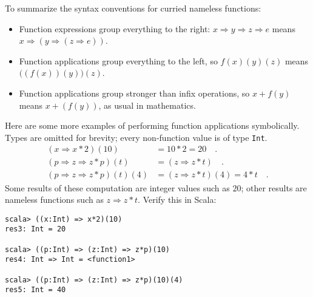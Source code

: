 To summarize the syntax conventions for curried nameless functions:
\begin{itemize}
\item Function expressions group everything to the right: $x\Rightarrow y\Rightarrow z\Rightarrow e$
means $x\Rightarrow\left(y\Rightarrow\left(z\Rightarrow e\right)\right)$.
\item Function applications group everything to the left, so $f(x)(y)(z)$
means $\big((f(x))(y)\big)(z)$.
\item Function applications group stronger than infix operations, so $x+f(y)$
means $x+(f(y))$, as usual in mathematics.
\end{itemize}
Here are some more examples of performing function applications symbolically.
Types are omitted for brevity; every non-function value is of type
\texttt{}\lstinline!Int!.
\begin{align*}
\left(x\Rightarrow x*2\right)(10) & =10*2=20\quad.\\
\left(p\Rightarrow z\Rightarrow z*p\right)\left(t\right) & =(z\Rightarrow z*t)\quad.\\
\left(p\Rightarrow z\Rightarrow z*p\right)(t)(4) & =(z\Rightarrow z*t)(4)=4*t\quad.
\end{align*}
Some results of these computation are integer values such as $20$;
other results are nameless functions such as $z\Rightarrow z*t$.
Verify this in Scala:
\begin{lstlisting}
scala> ((x:Int) => x*2)(10)
res3: Int = 20

scala> ((p:Int) => (z:Int) => z*p)(10)
res4: Int => Int = <function1>

scala> ((p:Int) => (z:Int) => z*p)(10)(4)
res5: Int = 40 
\end{lstlisting}

